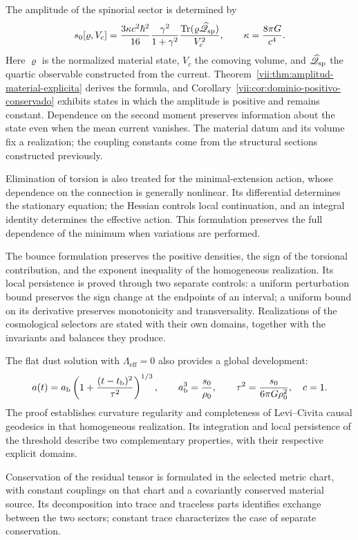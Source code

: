 The amplitude of the spinorial sector is determined by
\begin{equation}
 s_0[\varrho,V_c]
 =\frac{3\kappa c^2\hbar^2}{16}
   \frac{\gamma^2}{1+\gamma^2}
   \frac{\operatorname{Tr}
    (\varrho\widehat{\mathscr Q}_{\rm sp})}{V_c^2},
 \qquad \kappa=\frac{8\pi G}{c^4}.
 \label{vii:eq:programa-amplitud}
\end{equation}
Here \(\varrho\) is the normalized material state, \(V_c\) the comoving
volume, and \(\widehat{\mathscr Q}_{\rm sp}\) the quartic observable
constructed from the current.
Theorem~\ref{vii:thm:amplitud-material-explicita} derives the formula, and
Corollary~\ref{vii:cor:dominio-positivo-conservado} exhibits states
in which the amplitude is positive and remains constant. Dependence
on the second moment preserves information about the state even when
the mean current vanishes. The material datum and its volume fix a
realization; the coupling constants come from the structural
sections constructed previously.

Elimination of torsion is also treated for the minimal-extension
action, whose dependence on the connection is generally
nonlinear. Its differential determines the stationary equation;
the Hessian controls local continuation, and an integral identity
determines the effective action. This formulation preserves the
full dependence of the minimum when variations are performed.

The bounce formulation preserves the positive densities, the sign of
the torsional contribution, and the exponent inequality of the homogeneous
realization. Its local persistence is proved through two separate
controls: a uniform perturbation bound preserves the sign change
at the endpoints of an interval; a uniform bound on its derivative
preserves monotonicity and transversality. Realizations of the cosmological
selectors are stated with their own domains, together with the
invariants and balances they produce.

The flat dust solution with \(\Lambda_{\mathrm{eff}}=0\)
also provides a global development:
\[
 a(t)=a_{\rm b}\left(1+
       \frac{(t-t_{\rm b})^2}{\tau^2}\right)^{1/3},
 \qquad
 a_{\rm b}^3=\frac{s_0}{\rho_0},\qquad
 \tau^2=\frac{s_0}{6\pi G\rho_0^2},
 \quad c=1.
\]
The proof establishes curvature regularity and completeness of
Levi--Civita causal geodesics in that homogeneous realization.
Its integration and local persistence of the threshold describe two
complementary properties, with their respective explicit domains.

Conservation of the residual tensor is formulated in the selected
metric chart, with constant couplings on that chart and a
covariantly conserved material source. Its decomposition into trace
and traceless parts identifies exchange between the two sectors;
constant trace characterizes the case of separate conservation.


